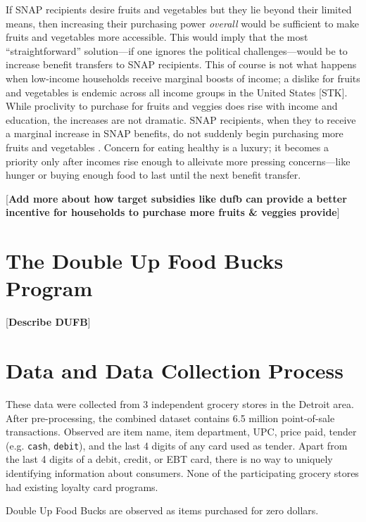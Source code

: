 \documentclass[11pt,letterpaper,]{book}
\begin{document}
If SNAP recipients desire fruits and vegetables but they lie beyond
their limited means, then increasing their purchasing power
\emph{overall} would be sufficient to make fruits and vegetables more
accessible. This would imply that the most ``straightforward''
solution---if one ignores the political challenges---would be to
increase benefit transfers to SNAP recipients. This of course is not
what happens when low-income households receive marginal boosts of
income; a dislike for fruits and vegetables is endemic across all income
groups in the United States {[}STK{]}. While proclivity to purchase for
fruits and veggies does rise with income and education, the increases
are not dramatic. SNAP recipients, when they to receive a marginal
increase in SNAP benefits, do not suddenly begin purchasing more fruits
and vegetables \citep{hayden_income_2003}. Concern for eating healthy is
a luxury; it becomes a priority only after incomes rise enough to
alleivate more pressing concerns---like hunger or buying enough food to
last until the next benefit transfer.

{[}\textbf{Add more about how target subsidies like dufb can provide a
better incentive for households to purchase more fruits \& veggies
provide}{]}

\section{The Double Up Food Bucks
Program}\label{the-double-up-food-bucks-program}

{[}\textbf{Describe DUFB}{]}

\section{Data and Data Collection
Process}\label{data-and-data-collection-process}

These data were collected from 3 independent grocery stores in the
Detroit area. After pre-processing, the combined dataset contains 6.5
million point-of-sale transactions. Observed are item name, item
department, UPC, price paid, tender (e.g. \texttt{cash},
\texttt{debit}), and the last 4 digits of any card used as tender. Apart
from the last 4 digits of a debit, credit, or EBT card, there is no way
to uniquely identifying information about consumers. None of the
participating grocery stores had existing loyalty card programs.

Double Up Food Bucks are observed as items purchased for zero dollars.
\end{document}
